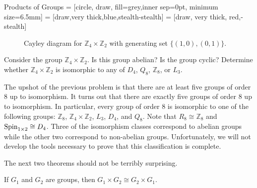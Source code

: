 \begin{section}{Products of Groups}
 = [circle, draw, fill=grey,inner sep=0pt, minimum size=6.5mm]
 = [draw,very thick,blue,stealth-stealth]
 = [draw, very thick, red,-stealth]

\begin{figure}[!ht]
\centering
{}
\caption{Cayley diagram for $\mathbb{Z}_4 \times \mathbb{Z}_2$ with generating set $\{(1,0),(0,1)\}$.}\label{fig:Cayley_Z4xZ2}
\end{figure}

\begin{problem}
Consider the group $\mathbb{Z}_4 \times \mathbb{Z}_2$.  Is this group abelian?  Is the group cyclic?  Determine whether $\mathbb{Z}_4 \times \mathbb{Z}_2$ is isomorphic to any of $D_4$, $Q_8$, $\mathbb{Z}_8$, or $L_3$.
\end{problem}

The upshot of the previous problem is that there are at least five groups of order 8 up to isomorphism.  It turns out that there are exactly five groups of order 8 up to isomorphism.  In particular, every group of order 8 is isomorphic to one of the following groups: $\mathbb{Z}_8$, $\mathbb{Z}_4 \times \mathbb{Z}_2$, $L_3$, $D_4$, and $Q_8$. Note that $R_8\cong \mathbb{Z}_8$ and $\operatorname{Spin}_{1\times 2}\cong D_4$. Three of the isomorphism classes correspond to abelian groups while the other two correspond to non-abelian groups.  Unfortunately, we will not develop the tools necessary to prove that this classification is complete.

The next two theorems should not be terribly surprising.

\begin{theorem}
If $G_1$ and $G_2$ are groups, then $G_1\times G_2\cong G_2\times G_1$.
\end{theorem}


\end{section}
